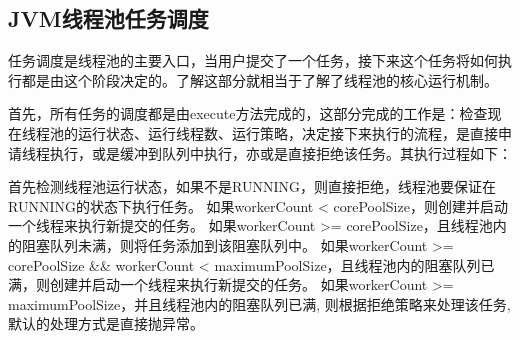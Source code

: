 \documentclass[../../../interview-questions.tex]{subfiles}
\begin{document}
\subsection{JVM线程池任务调度}

任务调度是线程池的主要入口，当用户提交了一个任务，接下来这个任务将如何执行都是由这个阶段决定的。了解这部分就相当于了解了线程池的核心运行机制。

首先，所有任务的调度都是由execute方法完成的，这部分完成的工作是：检查现在线程池的运行状态、运行线程数、运行策略，决定接下来执行的流程，是直接申请线程执行，或是缓冲到队列中执行，亦或是直接拒绝该任务。其执行过程如下：

首先检测线程池运行状态，如果不是RUNNING，则直接拒绝，线程池要保证在RUNNING的状态下执行任务。
如果workerCount < corePoolSize，则创建并启动一个线程来执行新提交的任务。
如果workerCount >= corePoolSize，且线程池内的阻塞队列未满，则将任务添加到该阻塞队列中。
如果workerCount >= corePoolSize \&\& workerCount < maximumPoolSize，且线程池内的阻塞队列已满，则创建并启动一个线程来执行新提交的任务。
如果workerCount >= maximumPoolSize，并且线程池内的阻塞队列已满, 则根据拒绝策略来处理该任务, 默认的处理方式是直接抛异常。
\end{document}
